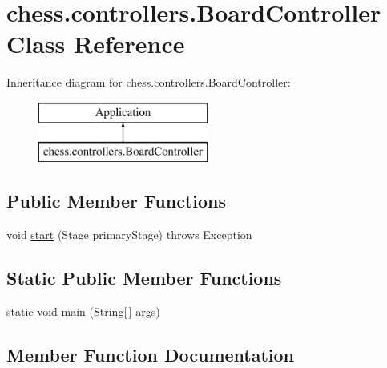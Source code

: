 \hypertarget{classchess_1_1controllers_1_1_board_controller}{}\section{chess.\+controllers.\+Board\+Controller Class Reference}
\label{classchess_1_1controllers_1_1_board_controller}
Inheritance diagram for chess.\+controllers.\+Board\+Controller\+:\begin{figure}[H]
\begin{center}
\leavevmode
\includegraphics[height=2.000000cm]{classchess_1_1controllers_1_1_board_controller}
\end{center}
\end{figure}
\subsection*{Public Member Functions}
\begin{DoxyCompactItemize}
\item 
void \mbox{\hyperlink{classchess_1_1controllers_1_1_board_controller_abd589cb5a8d0808c83932ffba970c747}{start}} (Stage primary\+Stage)  throws Exception 
\end{DoxyCompactItemize}
\subsection*{Static Public Member Functions}
\begin{DoxyCompactItemize}
\item 
static void \mbox{\hyperlink{classchess_1_1controllers_1_1_board_controller_a0a3fb5fc97d4e1536bd0111b96f835a6}{main}} (String\mbox{[}$\,$\mbox{]} args)
\end{DoxyCompactItemize}


\subsection{Member Function Documentation}
\mbox{\label{classchess_1_1controllers_1_1_board_controller_a0a3fb5fc97d4e1536bd0111b96f835a6}} 
